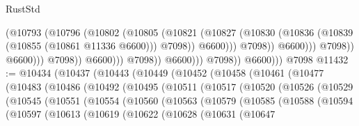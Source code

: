 \begin{lexlean}{RustStd}
\begin{coremodule}
                                                (@10793
                                                  (@10796
                                                    (@10802
                                                      (@10805
                                                        (@10821
                                                          (@10827
                                                            (@10830
                                                              (@10836
                                                                (@10839
                                                                  (@10855 (@10861 @11336 @6600)))
                                                                @7098))
                                                            @6600)))
                                                      @7098))
                                                  @6600)))
                                            @7098))
                                        @6600)))
                                  @7098))
                              @6600)))
                        @7098))
                    @6600)))
              @7098))
          @6600)))
    @7098
@11432 := @10434
    (@10437
      (@10443
        (@10449
          (@10452
            (@10458
              (@10461
                (@10477
                  (@10483
                    (@10486
                      (@10492
                        (@10495
                          (@10511
                            (@10517
                              (@10520
                                (@10526
                                  (@10529
                                    (@10545
                                      (@10551
                                        (@10554
                                          (@10560
                                            (@10563
                                              (@10579
                                                (@10585
                                                  (@10588
                                                    (@10594
                                                      (@10597
                                                        (@10613
                                                          (@10619
                                                            (@10622
                                                              (@10628
                                                                (@10631
                                                                  (@10647

\end{coremodule}
\end{lexlean}
